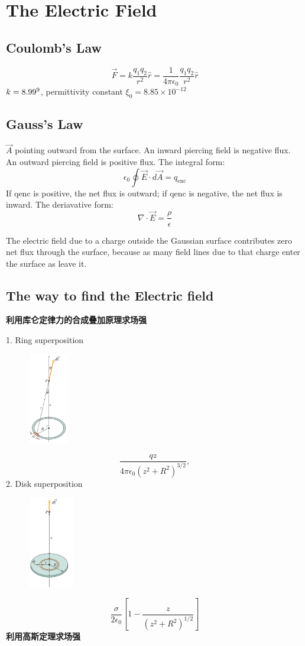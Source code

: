 \documentclass[11pt, a4paper]{article}
\begin{document}
\setcounter{page}{0}
\newpage
{}
\setcounter{page}{1}
\tableofcontents
\newpage
\setcounter{page}{1}
\section{The Electric Field}
\subsection{Coulomb’s Law}
$$\vec{F} = k\frac{q_1q_2}{r^2} \hat{r} = \frac{1}{4\pi \epsilon_0}\frac{q_1q_2}{r^2} \hat{r}$$
$k = 8.99\time 10^9$, permittivity constant $\xi_0 = 8.85\times10^{-12}$

\subsection{Gauss's Law}
$\vec{A}$ pointing outward from the surface. An inward piercing field is
negative flux. An outward piercing field is positive flux. 
The integral form:
$$\epsilon_0\oint\vec{E}\cdot d\vec{A}=q_{\mathrm{enc}}$$
If qenc is positive, the net flux is outward; if qenc is
negative, the net flux is inward.
The deriavative form:
$$\nabla \cdot \vec{E} = \frac{\rho}{\epsilon}$$

The electric field due to a charge outside the
Gaussian surface contributes zero net flux through the
surface, because as many field lines due to that charge
enter the surface as leave it.
\subsection{The way to find the Electric field}
\textbf{利用库仑定律力的合成叠加原理求场强}

1. Ring superposition 
\begin{figure}[htbp]
    \centering
    \includegraphics[height = 4cm]{2.png}
\end{figure}
$$\frac{qz}{4\pi\epsilon_0(z^2+R^2)^{3/2}},$$
2. Disk superposition 
\begin{figure}[htbp]
    \centering
    \includegraphics[height = 4cm]{3.png}
\end{figure}
$$\frac\sigma{2\epsilon_0}\left[1-\frac z{(z^2+R^2)^{1/2}}\right]$$
\textbf{利用高斯定理求场强}
\end{document}

